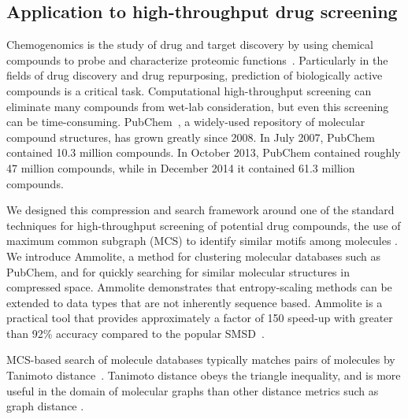 \documentclass[review,preprint,12pt]{elsarticle}
\renewcommand{\cite}{\citep} %
\theoremstyle{definition}
\theoremstyle{remark}
\numberwithin{equation}{section}
\begin{document}
\subsection{Application to high-throughput drug screening}

Chemogenomics is the study of drug and target discovery by using chemical
compounds to probe and characterize proteomic 
functions~\cite{bredel2004chemogenomics}.
Particularly in the fields of drug discovery and drug repurposing, prediction 
of biologically active compounds is a critical task. 
Computational high-throughput screening can eliminate many compounds from 
wet-lab consideration, but even this screening can be time-consuming.
PubChem~\cite{bolton2008pubchem}, a widely-used repository of molecular compound 
structures, 
has grown greatly since 2008. 
In July 2007, PubChem contained 10.3 million compounds.
In October 2013, PubChem contained roughly 47 million compounds, while
in December 2014 it contained 61.3 million compounds.

We designed this compression and search framework around one of the standard 
techniques for high-throughput screening of potential drug compounds, the use 
of maximum common subgraph (MCS) to identify similar motifs among molecules \cite{cao2008maximum, rahman2009small}.
We introduce Ammolite, a method for clustering molecular databases such as 
PubChem, and for quickly searching for 
similar molecular structures in compressed space.
Ammolite demonstrates that entropy-scaling methods can be extended to data types that are not inherently sequence based.
Ammolite is a practical 
tool that provides approximately a factor of 150 speed-up with greater than 92\% accuracy compared to the popular SMSD~\cite{rahman2009small}.

MCS-based search of molecule databases typically matches pairs of molecules by 
Tanimoto distance~\cite{rahman2009small}. 
Tanimoto distance obeys the triangle inequality, and is more useful in the 
domain of molecular graphs than other
distance metrics such as graph distance \cite{bunke1998graph}.
\end{document}

